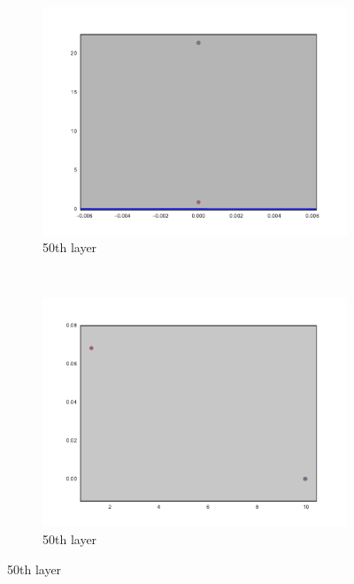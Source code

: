 \begin{figure}
    ~ %
    \begin{subfigure}[b]{0.3\textwidth}
        \includegraphics[width=\textwidth]{img/init/relu-bn/conv2d_50-0.pdf}
        \caption{\ReLUBN 50th layer}
        \label{fig:reluBNInit501}
    \end{subfigure}
    ~ %
    \begin{subfigure}[b]{0.3\textwidth}
        \includegraphics[width=\textwidth]{img/init/relu-bn/conv2d_50-2.pdf}
        \caption{\ReLUBN 50th layer}

\end{subfigure}
\end{figure}
